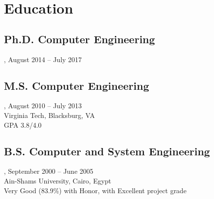 \section{Education}
\subsection{Ph.D. Computer Engineering}, August 2014 -- July 2017
\subsection{M.S. Computer Engineering}, August 2010 -- July 2013\\
Virginia Tech, Blacksburg, VA\\
GPA 3.8/4.0
\subsection{B.S. Computer and System Engineering}, September 2000 -- June 2005\\
Ain-Shams University, Cairo, Egypt\\
Very Good (83.9\%) with Honor, with Excellent project grade
